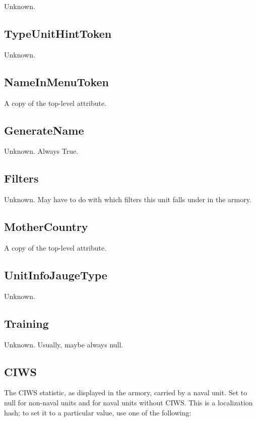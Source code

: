 \documentclass{article}
\begin{document}
Unknown.

\subsection{TypeUnitHintToken}

Unknown.

\subsection{NameInMenuToken}

A copy of the top-level attribute.

\subsection{GenerateName}

Unknown. Always True.

\subsection{Filters}

Unknown. May have to do with which filters this unit falls under in the armory.

\subsection{MotherCountry}

A copy of the top-level attribute.

\subsection{UnitInfoJaugeType}

Unknown.

\subsection{Training}

Unknown. Usually, maybe always null.

\subsection{CIWS}

The CIWS statistic, as displayed in the armory, carried by a naval unit. Set to null for non-naval units and for naval units without CIWS. This is a localization hash; to set it to a particular value, use one of the following:
\end{document}
